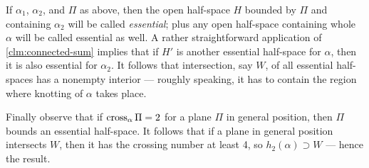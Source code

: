 If $\alpha_1$, $\alpha_2$, and $\Pi$ as above, then the open half-space $H$ bounded by $\Pi$ and containing $\alpha_2$ will be called \emph{essential};
plus any open half-space containing whole $\alpha$ will be called essential as well.
A rather straightforward application of \ref{clm:connected-sum} implies that if $H'$ is another essential half-space for $\alpha$, then it is also essential for $\alpha_2$.
It follows that intersection, say $W$, of all essential half-spaces has a nonempty interior --- roughly speaking, it has to contain the region where knotting of $\alpha$ takes place.

Finally observe that if $\mathop{\rm cross}\nolimits_\alpha\Pi=2$ for a plane $\Pi$ in general position, then $\Pi$ bounds an essential half-space. 
It follows that if a plane in general position intersects $W$, then it has the crossing number at least 4,
so $h_2(\alpha)\supset W$ --- hence the result.
\qeds

